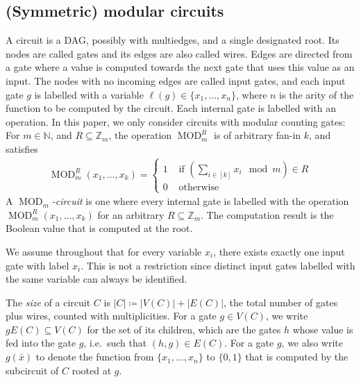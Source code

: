 \documentclass[11pt]{article}
\DeclareMathOperator{\MOD}{MOD}
\newcommand{\bbN}{\mathbb{N}}
\newcommand{\bbZ}{\mathbb{Z}}
\theoremstyle{definition}
\theoremstyle{plain}
\theoremstyle{remark}
\theoremstyle{remark}
\begin{document}
\subsection{(Symmetric) modular circuits}

A circuit is a DAG, possibly with multiedges, and a single designated root. Its nodes are called gates and its edges are also called wires. Edges are directed from a gate where a value is computed towards the next gate that uses this value as an input. The nodes with no incoming edges are called input gates, and each input gate $g$ is labelled with a variable $\ell(g) \in \{x_1, \dots, x_n\}$, where $n$ is the arity of the function to be computed by the circuit. Each internal gate is labelled with an operation. In this paper, we only consider circuits with modular counting gates: For $m \in \bbN$, and $R \subseteq \bbZ_m$, the operation $\MOD_m^R$ is of arbitrary fan-in $k$, and satisfies
\begin{align*}
	\MOD_m^R(x_1, \dots, x_k) = \begin{cases}
		1 & \text{ if } (\sum_{i \in [k]} x_i \mod m) \in R\\
		0 & \text{ otherwise}
	\end{cases}
\end{align*}
A \emph{$\MOD_m$-circuit} is one where every internal gate is labelled with the operation $\MOD_m^R(x_1, \dots, x_k)$ for an arbitrary $R \subseteq \bbZ_m$. The computation result is the Boolean value that is computed at the root. 

We assume throughout that for every variable $x_i$, there exists exactly one input gate with label $x_i$. This is not a restriction since distinct input gates labelled with the same variable can always be identified.

The \emph{size} of a circuit $C$ is $|C| \coloneqq |V(C)| + |E(C)|$, the total number of gates plus wires, counted with multiplicities.
For a gate $g \in V(C)$, we write $gE(C) \subseteq V(C)$ for the set of its children, which are the gates $h$ whose value is fed into the gate $g$, i.e.\ such that $(h,g) \in E(C)$. For a gate $g$, we also write $g(\bar{x})$ to denote the function from $\{x_1, \dots, x_n\}$ to $\{0,1\}$ that is computed by the subcircuit of $C$ rooted at $g$.
\end{document}
